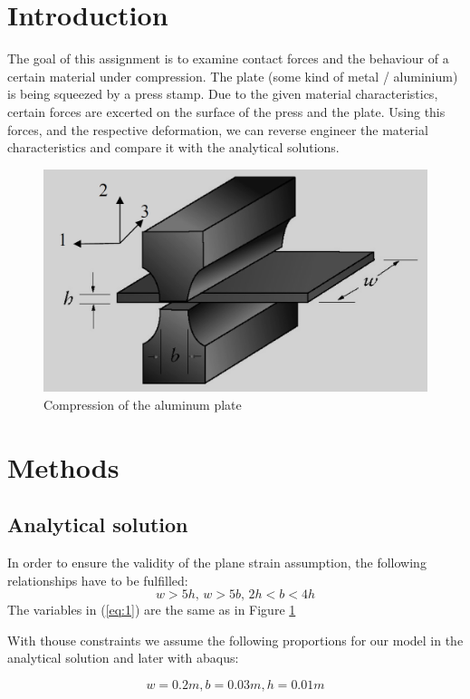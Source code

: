 \documentclass[12pt]{article}
\begin{document}
\tableofcontents
\pagebreak
\section{Introduction}
The goal of this assignment is to examine contact forces and the behaviour of a 
certain material under compression.
The plate (some kind of metal / aluminium) is being squeezed by a press stamp. Due to 
the given material characteristics,
certain forces are excerted on the surface of the press and the plate. 
Using this forces, and the respective deformation, we can reverse engineer 
the material characteristics and compare it with the analytical solutions.


\begin{figure}[!htb]
  \centering
  \includegraphics[width=0.6\linewidth]{pics/shematics}
  \caption{Compression of the aluminum plate}
  \label{fig:1}
\end{figure}
\newpage
\section{Methods}

\subsection{Analytical solution}
In order to ensure the validity of the plane strain assumption, the following relationships have to
be fulfilled:
\begin{equation}\label{eq:1}
  w > 5h, \, w > 5b,\, 2h < b < 4h
\end{equation}
The variables in (\ref{eq:1}) are the same as in Figure \ref{fig:1}

With thouse constraints we assume the following proportions for our model in the analytical solution and later with abaqus:

\begin{equation}\label{eq:2}
  w = 0.2m, b = 0.03m, h = 0.01m
\end{equation}
\end{document}
